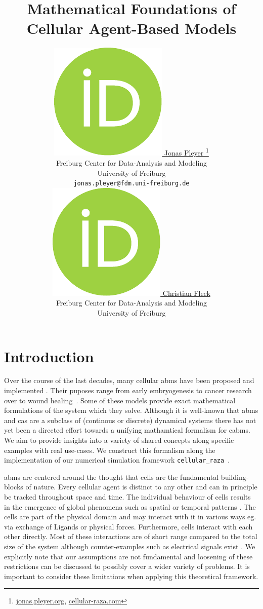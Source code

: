 \documentclass{article}
\title{
    Mathematical Foundations of\\
    Cellular Agent-Based Models
}
\author{
    \href{https://orcid.org/0009-0001-0613-7978}{
        \includegraphics[scale=0.06]{orcid.pdf}
        \hspace{1mm}Jonas Pleyer
    }
    \thanks{
        \href{https://jonas.pleyer.org}{jonas.pleyer.org},
        \href{https://cellular-raza.com}{cellular-raza.com}
    }\\
	Freiburg Center for Data-Analysis and Modeling\\
	University of Freiburg\\
	\texttt{jonas.pleyer@fdm.uni-freiburg.de} \\
	\And
	\href{https://orcid.org/0000-0002-6371-4495}{
        \includegraphics[scale=0.06]{orcid.pdf}
        \hspace{1mm}Christian Fleck
    }\\
	Freiburg Center for Data-Analysis and Modeling\\
	University of Freiburg
}
\begin{document}
\maketitle

\begin{abstract}
\end{abstract}




\section{Introduction}
\label{sec:introduction}
Over the course of the last decades, many cellular \acp{abm} have been proposed and implemented
\cite{PoncedeLeon2022,Hoehme2010,Lupperger2020}.
Their puposes range from early embryogenesis to cancer research over to wound
healing~\cite{Ziraldo2013}.
Some of these models provide exact mathematical formulations \cite{Ghaffarizadeh2018,Tanaka2015} of
the system which they solve.
Although it is well-known that \acp{abm} and \acp{ca} are a subclass of (continous or discrete)
dynamical systems \cite{Wolfram1984} there has not yet been a directed effort towards a unifying
mathamtical formalism for \acp{cabm}.
We aim to provide insights into a variety of shared concepts along specific examples with real
use-cases.
We construct this formalism along the implementation of our numerical simulation framework
\lstinline{cellular_raza}~\cite{Pleyer_cellular_raza_2024}.

\acp{abm} are centered around the thought that cells are the fundamental building-blocks of nature.
Every cellular agent is distinct to any other and can in principle be tracked throughout space and
time.
The individual behaviour of cells results in the emergence of global phenomena such as spatial or
temporal patterns \cite{Owen2020,Wolpert1969,Giudicelli2007}.
The cells are part of the physical domain and may interact with it in various ways eg. via exchange
of Ligands or physical forces.
Furthermore, cells interact with each other directly.
Most of these interactions are of short range compared to the total size of the system although
counter-examples such as electrical signals exist \cite{Ded2021}.
We explicitly note that our assumptions are not fundamental and loosening of these restrictions can
be discussed to possibly cover a wider variety of problems.
It is important to consider these limitations when applying this theoretical framework.
\end{document}
